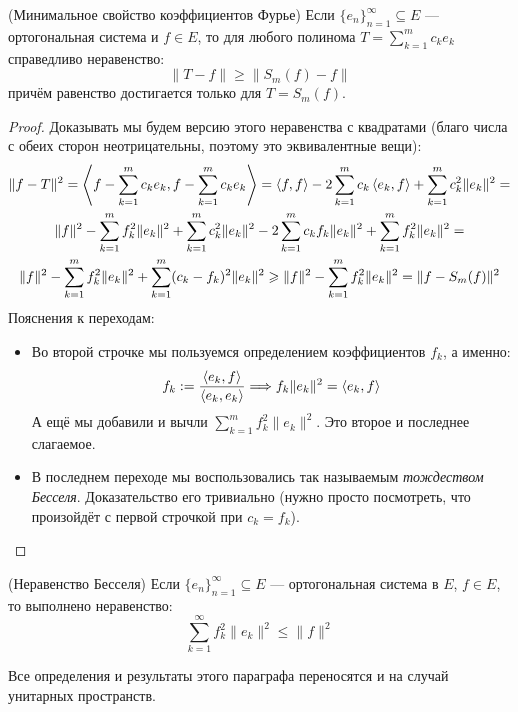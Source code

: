 \begin{theorem} (Минимальное свойство коэффициентов Фурье)
	Если $\{e_n\}_{n = 1}^\infty \subseteq E$ --- ортогональная система и $f \in E$, то для любого полинома $T = \sum_{k = 1}^m c_ke_k$ справедливо неравенство:
	\[
		\|T - f\| \ge \|S_m(f) - f\|
	\]
	причём равенство достигается только для $T = S_m(f)$.
\end{theorem}

\begin{proof}
	Доказывать мы будем версию этого неравенства с квадратами (благо числа с обеих сторон неотрицательны, поэтому это эквивалентные вещи):
	\begin{multline*}
		\|f - T\|^2 = \left\langle f - \sum_{k = 1}^m c_ke_k, f - \sum_{k = 1}^m c_ke_k\right\rangle = \left\langle f, f\right\rangle - 2\sum_{k = 1}^m c_k \left\langle e_k, f\right\rangle + \sum_{k = 1}^m c_k^2 \|e_k\|^2 =
		\\
		\|f\|^2 - \sum_{k = 1}^m f_k^2\|e_k\|^2 + \sum_{k = 1}^m c_k^2\|e_k\|^2 - 2\sum_{k = 1}^m c_kf_k\|e_k\|^2 + \sum_{k = 1}^m f_k^2\|e_k\|^2 =
		\\
		\|f\|^2 - \sum_{k = 1}^m f_k^2\|e_k\|^2 + \sum_{k = 1}^m (c_k - f_k)^2\|e_k\|^2 \geqslant \|f\|^2 - \sum_{k = 1}^m f_k^2\|e_k\|^2 = \|f - S_m(f)\|^2
	\end{multline*}
	Пояснения к переходам:
	\begin{itemize}
		\item Во второй строчке мы пользуемся определением коэффициентов $f_k$, а именно:
		\[
			f_k := \frac{\left\langle e_k, f\right\rangle}{\left\langle e_k, e_k\right\rangle} \Longrightarrow f_k\|e_k\|^2 = \left\langle e_k, f\right\rangle
		\]
		А ещё мы добавили и вычли $\sum_{k = 1}^m f_k^2\|e_k\|^2$. Это второе и последнее слагаемое.
		
		\item В последнем переходе мы воспользовались так называемым \textit{тождеством Бесселя}. Доказательство его тривиально (нужно просто посмотреть, что произойдёт с первой строчкой при $c_k = f_k$).
	\end{itemize}
\end{proof}

\begin{corollary} (Неравенство Бесселя)
	Если $\{e_n\}_{n = 1}^\infty \subseteq E$ --- ортогональная система в $E$, $f \in E$, то выполнено неравенство:
	\[
		\sum_{k = 1}^\infty f_k^2\|e_k\|^2 \le \|f\|^2
	\]
\end{corollary}

\begin{note}
	Все определения и результаты этого параграфа переносятся и на случай унитарных пространств.
\end{note}
 
